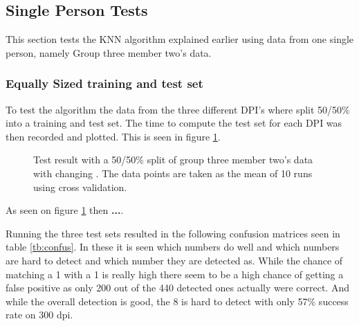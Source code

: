 

\subsection{Single Person Tests}
This section tests the KNN algorithm explained earlier using data from one single person, namely Group three member two's data.
%
%
%
%

\subsubsection{Equally Sized training and test set}
To test the algorithm the data from the three different DPI's where split 50/50\% into a training and test set. The time to compute the test set for each DPI was then recorded and plotted. This is seen in figure \ref{fig:PersonDependent_5050}.

\begin{figure}[H]
\centering
\caption{Test result with a 50/50\% split of group three member two's data with changing . The data points are taken as the mean of 10 runs using cross validation.}
\label{fig:PersonDependent_5050}
\end{figure}

As seen on figure \ref{fig:PersonDependent_5050} then \textbf{...}.

Running the three test sets resulted in the following confusion matrices seen in table \ref{tb:confus}.
In these it is seen which numbers do well and which numbers are hard to detect and which number they are detected as.
While the chance of matching a 1 with a 1 is really high there seem to be a high chance of getting a false positive as only 200 out of the 440 detected ones actually were correct.
And while the overall detection is good, the 8 is hard to detect with only 57\% success rate on 300 dpi.

